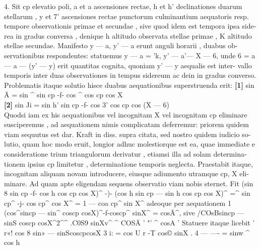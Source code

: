 \documentclass[12pt,a4paper]{article}
\begin{document}
\newpage

4.
Sit  cp  elevatio  poli,  a  et  a  ascensiones  rectae,  h  et  h'  declinationes  duarum
stellarum ,  y  et  7'  ascensiones  rectae  punctorum  culminantium  aequatoris  resp.
tempore  observationis  primae  et  secundae ,  sive  quod  idem  est  tempora  ipsa  side-
rea  in  gradus  conversa ,  denique  h  altitudo  observata  stellae  primae ,  K  altitudo
stellae  secundae.  Manifesto  y  ---  a,  y' --- a  erunt  anguli  horarii ,  duabus  ob-
servationibus  respondentes:  statuemus  y  ---  a  =  'k,  y' --- a'---  X  ---  6,  unde
6  =  a  ---  a  ---  (y' --- y)  erit  quantitas  cognita,  quoniam  y' --- y  aequalis  est  inter-
vallo  temporis  inter  duas  observationes  in  tempus  sidereum  ac  dein  in  gradus
converso.  Problematis  itaque  solutio  hisce  duabus  aequationibus  superstruenda
erit:
\noindent \textbf{[1]} sin  Ä  =  sin  \^{}  sin  cp -f- cos  \^{}  cos  cp  cos  X\\
\noindent \textbf{[2]} sin  Ji  =  sin  h'  sin  cp  -f-  cos  3'  cos  cp  cos  (X  ---  6)\\
Quodsi  iam  ex  his  aequationibus  vel  incognitam  X  vel  incognitam  cp  eliminare
susciperemus ,  ad  aequationem  nimis  complicatam  deferremur:  priorem  quidem
viam  sequutus  est  dar.  Kraft  in  diss.  supra  citata,  sed  nostro  quidem  iudicio  so-
lutio, quam  hoc  modo  eruit,  longior  adhuc  molestiorque  est  ea,  quae  immediate
e  consideratione  trium  triangulorum  derivatur ,  etiamsi  illa  ad  solam  determina-
tionem  ipsius  cp  limitetur ,  determinatione  temporis  neglecta.  Praestabit  itaque,
incognitam  aliquam  novam  introducere,  eiusque  adiumento  utramque  cp,  X  eli-
minare.    Ad  quam  apte  eligendam  sequens  observatio  viam  nobis  sternet.     Fit
(sin  8  sin  cp  -f-  cos  h  cos  cp  cos  X)\^{}  -)-  (cos  h  sin  cp  ---  sin  h  cos  cp  cos  X)\^{}
=\^{}  sin  cp\^{}  -j-  cos  cp\^{}  cos  X\^{}  =  1  ---  coa  cp\^{}  sin  X\^{}
adeoque  per  aequationem  1
(cos\^{}sincp --- sin\^{}  coscp  cosX)\^{}-f-coscp\^{}  sinX\^{}  =  cosÄ\^{},
sive
/COsBsincp  ---  sinS  coscp  cosX\^{}2\^{}\^{}  .C0S9  sinXv\^{}
\^{}  COSÄ  '    "'     \^{}       cosA      '
Statuere  itaque  licebit  '
r«!  cos 8  sin»  ---  sinScoscpcosX
3  
i:
=  cos  U
r -T  cos©  sinX  .
4  --- ----     =  sinw
\^{}      cos  h

\newpage
\end{document}
